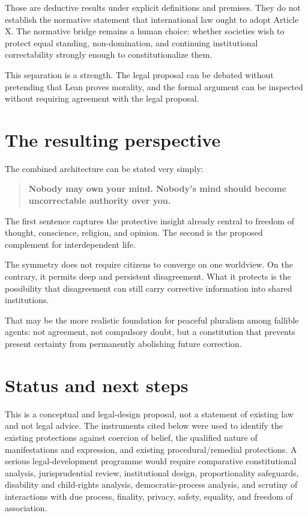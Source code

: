 \documentclass[11pt,a4paper]{article}
\begin{document}
Those are deductive results under explicit definitions and premises. They do not establish the normative statement that international law ought to adopt Article X. The normative bridge remains a human choice: whether societies wish to protect equal standing, non-domination, and continuing institutional correctability strongly enough to constitutionalize them.

This separation is a strength. The legal proposal can be debated without pretending that Lean proves morality, and the formal argument can be inspected without requiring agreement with the legal proposal.

\section{The resulting perspective}

The combined architecture can be stated very simply:
\begin{quote}
\textbf{Nobody may own your mind. Nobody's mind should become uncorrectable authority over you.}
\end{quote}

The first sentence captures the protective insight already central to freedom of thought, conscience, religion, and opinion. The second is the proposed complement for interdependent life.

The symmetry does not require citizens to converge on one worldview. On the contrary, it permits deep and persistent disagreement. What it protects is the possibility that disagreement can still carry corrective information into shared institutions.

That may be the more realistic foundation for peaceful pluralism among fallible agents: not agreement, not compulsory doubt, but a constitution that prevents present certainty from permanently abolishing future correction.

\section*{Status and next steps}

This is a conceptual and legal-design proposal, not a statement of existing law and not legal advice. The instruments cited below were used to identify the existing protections against coercion of belief, the qualified nature of manifestations and expression, and existing procedural/remedial protections. A serious legal-development programme would require comparative constitutional analysis, jurisprudential review, institutional design, proportionality safeguards, disability and child-rights analysis, democratic-process analysis, and scrutiny of interactions with due process, finality, privacy, safety, equality, and freedom of association.
\end{document}

